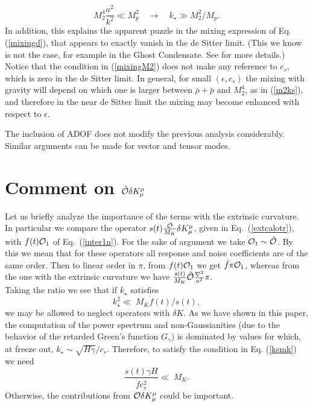 \documentclass[11pt,amsmath,floats,floatfix,nofootinbib,secnumarabic, superscriptaddress, tightenlines]{revtex4}
\newcommand{\beq}{\begin{equation}}
\newcommand{\eeq}{\end{equation}}
\newcommand{\be}{\begin{equation}}
\newcommand{\calo}{{\cal O}}
\begin{document}
{\be\label{mixingM2}
 M_2^4 \frac{a^2}{k^2}\ll M_p^2 \quad \to\quad k_\star  \gg M_2^2/M_p.
 \eeq
In addition, this explains the apparent puzzle in the mixing expression of Eq. (\ref{mixingd}), that appears to exactly vanish in the de Sitter limit. (This we know is not the case, for example in the Ghost Condensate. See \cite{eft1} for more details.) Notice that the condition in (\ref{mixingM2}) does not make any reference to $c_s$, which is zero in the de Sitter limit. In general, for small $(\epsilon, c_s)$ the mixing with gravity will depend on which one is larger between $\bar\rho+\bar p$ and $M_2^4$, as in (\ref{m2ks}), and therefore in the near de Sitter limit the mixing may become enhanced with respect to $\epsilon$. 

The inclusion of ADOF does not modify the previous analysis considerably. Similar arguments can be made for vector and tensor modes.


\section{Comment on $\hat\calo\delta K^{\mu}_{\mu}$}\label{dodk}

Let us briefly analyze the importance of the terms with the extrinsic curvature. In particular we  compare  the operator  $s(t)\frac{\hat\calo}{M_K}\delta K^{\mu}_{\mu}$, given in Eq.~(\ref{extcalotr}), with $f(t)\calo_1$ of  Eq.~(\ref{inter1n}). For the sake of argument we take $\calo_1\sim\hat{\calo}$. By this we mean that for these operators all response and noise coefficients are of the same order. Then to linear order in $\pi$, from $f(t){\calo}_1$ we get $\dot{f}\pi\calo_1$, whereas from the one with the extrinsic curvature we have $\frac{s(t)}{M_{K}}\hat{\calo}\frac{\nabla^2}{a^2}\pi.$\\

Taking the ratio we see that if $k_\star$ satisfies \beq \label{ksmk} k_\star^2\ll~M_{K}\dot{f}(t)/s(t), \eeq we may be allowed to neglect operators with $\delta K$. As we have shown in this paper, the computation of the power spectrum and non-Gaussianities (due to the behavior of the retarded Green's function $G_{\gamma}$) is dominated by values for which, at freeze out, $k_\star\sim \sqrt{H\gamma}/c_s$. Therefore, to satisfy the condition in Eq. (\ref{ksmk}) we need  \beq \frac{s(t)\gamma H}{\dot f c_s^2} \ll~M_{K}. \eeq
Otherwise, the contributions from  $\calo\delta K^{\mu}_{\mu}$ could be important.

}
\end{document}
